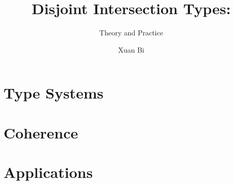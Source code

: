 \documentclass{mimosis}
\title{Disjoint Intersection Types:}
\subtitle{Theory and Practice}
\author{Xuan Bi}
\begin{document}
\frontmatter
  
  

  \tableofcontents

\mainmatter

  
  


  \part{Type Systems}

  
  

  \part{Coherence}

  


  \part{Applications}

  

  
  

\backmatter

  \begingroup
    \let\clearpage\relax
    \glsaddall
    \printglossary[type=\acronymtype]
    \newpage
    \printglossary
  \endgroup

  \printindex
  \printbibliography
\end{document}
